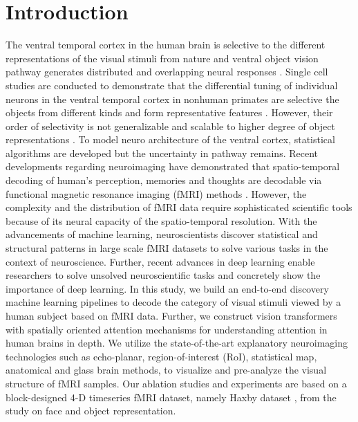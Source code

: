 \documentclass[10pt, twocolumn, letterpaper]{article}
\begin{document}
\section{Introduction}
The ventral temporal cortex in the human brain is selective to the different representations of the visual stimuli from nature and ventral object vision pathway generates distributed and overlapping neural responses \cite{tanaka1996inferotemporal}. Single cell studies are conducted to demonstrate that the differential tuning of individual neurons in the ventral temporal cortex in nonhuman primates are selective the objects from different kinds and form representative features \cite{gross1972visual, tanaka1996inferotemporal}. However, their order of selectivity is not generalizable and scalable to higher degree of object representations \cite{ds000105:00001}. To model neuro architecture of the ventral cortex, statistical algorithms are developed but the uncertainty in pathway remains. Recent developments regarding neuroimaging have demonstrated that spatio-temporal decoding of human's perception, memories and thoughts are decodable via functional magnetic resonance imaging (fMRI) methods \cite{huang2021fmri}. However, the complexity and the distribution of fMRI data require sophisticated scientific tools because of its neural capacity of the spatio-temporal resolution. With the advancements of machine learning, neuroscientists discover statistical and structural patterns in large scale fMRI datasets to solve various tasks in the context of neuroscience. Further, recent advances in deep learning enable researchers to solve unsolved neuroscientific tasks \cite{koster2018big} and concretely show the importance of deep learning.
In this study, we build an end-to-end discovery machine learning pipelines to decode the category of visual stimuli viewed by a human subject based on fMRI data. Further, we construct vision transformers with spatially oriented attention mechanisms for understanding attention in human brains in depth. We utilize the state-of-the-art explanatory neuroimaging technologies such as echo-planar, region-of-interest (RoI), statistical map, anatomical and glass brain methods, to visualize and pre-analyze the visual structure of fMRI samples. Our ablation studies and experiments are based on a block-designed 4-D timeseries fMRI dataset, namely Haxby dataset \cite{hansoncombinatorial, o2005partially, ds000105:00001}, from the study on face and object representation.
\end{document}
